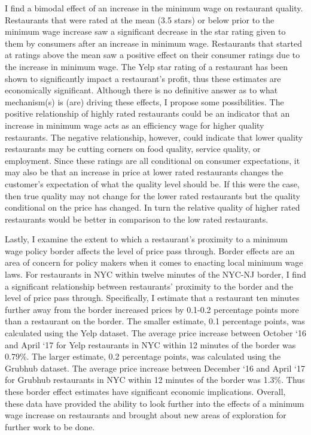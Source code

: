 \documentclass[11pt]{article}
\begin{document}
 I find a bimodal effect of an increase in the minimum wage on restaurant quality. Restaurants that were rated at the mean (3.5 stars) or below  prior to the minimum wage increase saw a significant decrease in the star rating given to them by consumers after an increase in minimum wage. Restaurants that started at ratings above the mean saw a positive effect on their consumer ratings due to the increase in minimum wage. The Yelp star rating of a restaurant has been shown to significantly impact a restaurant's profit, thus these estimates are economically significant. Although there is no definitive answer as to what mechanism(s) is (are) driving these effects, I propose some possibilities. The positive relationship of highly rated restaurants could be an indicator that an increase in minimum wage acts as an efficiency wage for higher quality restaurants. The negative relationship, however, could indicate that lower quality restaurants may be cutting corners on food quality, service quality, or employment. Since these ratings are all conditional on consumer expectations, it may also be that an increase in price at lower rated restaurants changes the customer's expectation of what the quality level should be. If this were the case, then true quality may not change for the lower rated restaurants but the quality conditional on the price has changed. In turn the relative quality of higher rated restaurants would be better in comparison to the low rated restaurants. 

Lastly, I examine the extent to which a restaurant's proximity to a minimum wage policy border affects the level of price pass through. Border effects are an area of concern for policy makers when it comes to enacting local minimum wage laws. For restaurants in NYC within twelve minutes of the NYC-NJ border, I find a significant relationship between restaurants' proximity to the border and the level of price pass through. Specifically, I estimate that a restaurant ten minutes further away from the border increased prices by 0.1-0.2 percentage points more than a restaurant on the border. The smaller estimate, 0.1 percentage points, was calculated using the Yelp dataset. The average price increase between October `16 and April `17 for Yelp restaurants in NYC within 12 minutes of the border was 0.79\%. The larger estimate, 0.2 percentage points, was calculated using the Grubhub dataset. The average price increase between December `16 and April `17 for Grubhub restaurants in NYC within 12 minutes of the border was 1.3\%. Thus these border effect estimates have significant economic implications. Overall, these data have provided the ability to look further into the effects of a minimum wage increase on restaurants and brought about new areas of exploration for further work to be done.
\end{document}
